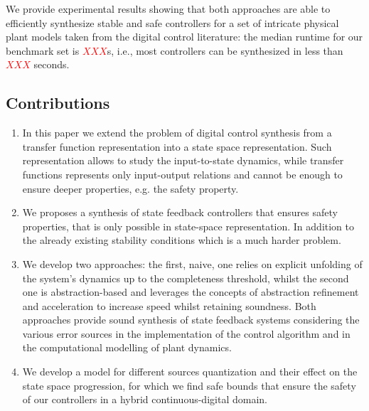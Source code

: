 \documentclass[runningheads,a4paper]{llncs}
\begin{document}
We provide experimental results 
showing that both approaches are able to efficiently synthesize stable and safe controllers 
for a set of intricate physical plant models taken from the digital 
control literature: the median runtime for our benchmark
set is \textcolor{red}{$XXX$}s, i.e., most controllers can be synthesized in less
than \textcolor{red}{$XXX$} seconds.


\subsection*{Contributions} 

\begin{enumerate}
%
\item In this paper we extend the problem of digital control synthesis 
  from a transfer function representation into a state space representation. 
  Such representation allows to study the  input-to-state dynamics, while 
  transfer functions represents only input-output relations and cannot be 
  enough to ensure deeper properties, e.g. the safety property.
%
\item We proposes a synthesis of state feedback controllers that ensures 
  safety properties, that is only  possible in state-space representation. 
  In addition to the already existing stability conditions which is a much 
  harder problem.
%
\item We develop two approaches: the first, naive, one relies on
  explicit unfolding of the system's dynamics up to the completeness
  threshold, whilst the second one is abstraction-based and leverages
  the concepts of abstraction refinement and acceleration to increase 
  speed whilst retaining soundness. Both approaches provide sound
  synthesis of state feedback systems considering the various
  error sources in the implementation of the control algorithm and in the
  computational modelling of plant dynamics.
%
\item We develop a model for different sources quantization and their
  effect on the state space progression, for which we find safe bounds
  that ensure the safety of our controllers in a hybrid
  continuous-digital domain.
%
\end{enumerate}
\end{document}
